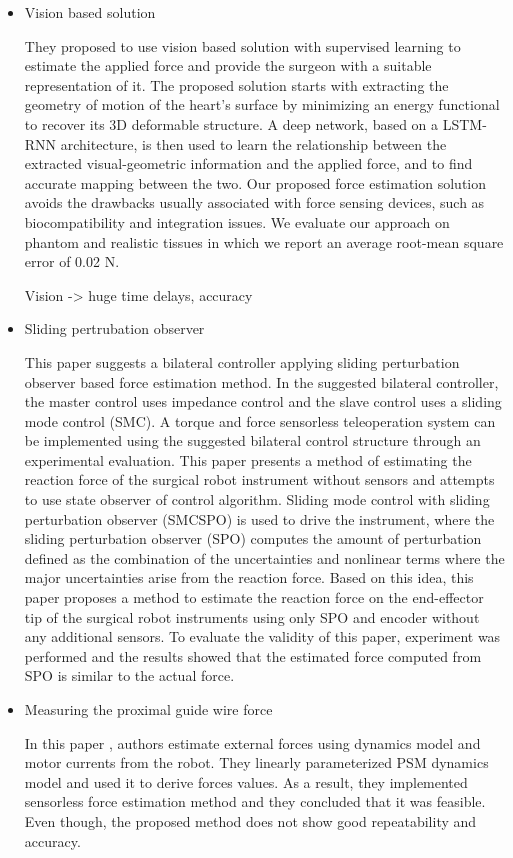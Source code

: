\begin{itemize}
\item Vision based solution \cite{aviles_towards_2017}

They proposed to use vision based solution with supervised learning to estimate the applied force and provide the surgeon with a suitable representation of it.
 The proposed solution starts with extracting the geometry of motion of the heart's surface by minimizing an energy functional to recover its 3D deformable structure. A deep network, based on a LSTM-RNN architecture, is then used to learn the relationship between the extracted visual-geometric information and the applied force, and to find accurate mapping between the two. Our proposed force estimation solution avoids the drawbacks usually associated with force sensing devices, such as biocompatibility and integration issues. We evaluate our approach on phantom and realistic tissues in which we report an average root-mean square error of 0.02 N.

Vision -> huge time delays, accuracy

\item Sliding pertrubation observer

This paper suggests a bilateral controller applying sliding perturbation 
observer based force estimation method. In the suggested bilateral controller, the master control uses impedance control and the slave control uses a sliding mode control (SMC). A torque and force sensorless teleoperation system can be implemented using the suggested bilateral control structure through an experimental evaluation. This paper presents a method of estimating the reaction force of the surgical robot instrument without sensors and attempts to use state observer of control algorithm. Sliding mode control with sliding perturbation observer (SMCSPO) is used to drive the instrument, where the sliding perturbation observer (SPO) computes the amount of perturbation defined as the combination of the uncertainties and nonlinear terms where the major uncertainties arise from the reaction force. Based on this idea, this paper proposes a method to estimate the reaction force on the end-effector tip of the surgical robot instruments using only SPO and encoder without any additional sensors. To evaluate the validity of this paper, experiment was performed and the results showed that the estimated force computed from SPO is similar to the actual force.

\item Measuring the proximal guide wire force  \cite{sang_hongqiang_external_2017}

In this paper \cite{sang_hongqiang_external_2017}, authors estimate external forces using dynamics model and motor currents from the robot. They linearly parameterized PSM dynamics model and used it to derive forces values. As a result, they implemented sensorless force estimation method and they concluded that it was feasible. Even though, the proposed method does not show good repeatability and accuracy.

\end{itemize}

